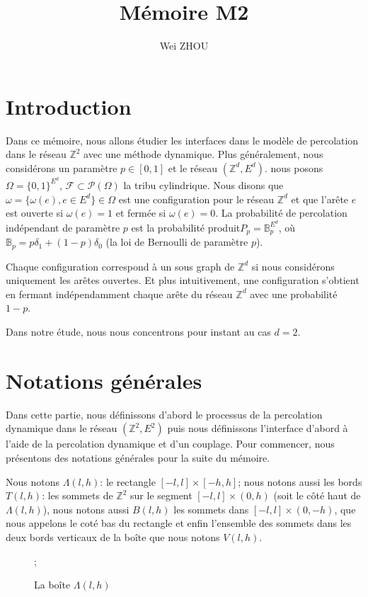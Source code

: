 \documentclass[titlepage,a4paper,12pt]{article}
\title{Mémoire M2}
\author{Wei ZHOU}
\newcounter{cor}
\begin{document}
\maketitle

\section{Introduction}
Dans ce mémoire, nous allons étudier les interfaces dans le modèle de percolation dans le réseau $\mathbb{Z}^2$ avec une méthode dynamique. Plus généralement, nous considérons un paramètre $p\in [0,1]$ et le réseau $(\mathbb{Z}^d,E^d)$. nous posons $\Omega = \{0,1\}^{E^d}$, $\mathcal{F}\subset \mathcal{P}(\Omega)$ la tribu cylindrique. Nous disons que $\omega = \{\omega(e), e\in E^d\} \in \Omega$ est une configuration pour le réseau $\mathbb{Z}^d$ et que l'arête $e$ est ouverte si $\omega(e) = 1$ et fermée si $\omega(e)= 0$. La probabilité de percolation indépendant de paramètre $p$ est la probabilité produit$P_p = \mathbb{B}_p^{E^d}$, où $\mathbb{B}_p = p\delta_1 +(1-p)\delta_0 $ (la loi de Bernoulli de paramètre $p$).

Chaque configuration correspond à un sous graph de $\mathbb{Z}^d$ si nous considérons uniquement les arêtes ouvertes. Et plus intuitivement, une configuration s'obtient en fermant indépendamment chaque arête du réseau $\mathbb{Z}^d$ avec une probabilité $1-p$. 

Dans notre étude, nous nous concentrons pour instant au cas $d = 2$.

\section{Notations générales}
Dans cette partie, nous définissons d'abord le processus de la percolation dynamique dans le réseau $(\mathbb{Z}^2,E^2)$ puis nous définissons l'interface d'abord à l'aide de la percolation dynamique et d'un couplage. Pour commencer, nous présentons des notations générales pour la suite du mémoire.

Nous notons $\Lambda(l,h)$: le rectangle $[-l,l]\times[-h,h]$;  nous notons aussi les bords $T(l,h)$: les sommets de $\mathbb{Z}^2$ sur le segment $[-l,l]\times(0,h)$ (soit le côté haut de $\Lambda(l,h)$), nous notons aussi $B(l,h)$ les sommets dans $[-l,l]\times(0,-h)$, que nous appelons le coté bas du rectangle et enfin l'ensemble des sommets dans les deux bords verticaux de la boîte que nous notons $V(l,h)$.
\begin{figure}[h]
\center
{}
\caption{La boîte $\Lambda(l,h)$};
\end{figure}
\end{document}
